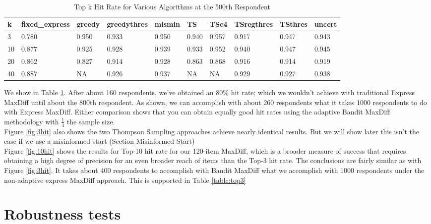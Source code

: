 \documentclass[nonblindrev]{informs3}
\begin{document}
\begin{table}
\begin{center}
\begin{tabular}{llllllllll}
\hline   k &  fixed\_express &  greedy &  greedythres &  mismin &    TS &  TSe4 &  TSregthres &  TSthres &  uncert \\ \hline   3 &          0.780 &   0.950 &        0.933 &   0.950 & 0.940 & 0.957 &       0.917 &    0.947 &   0.943 \\  10 &          0.877 &   0.925 &        0.928 &   0.939 & 0.933 & 0.952 &       0.940 &    0.947 &   0.945 \\  20 &          0.862 &   0.827 &        0.914 &   0.928 & 0.863 & 0.868 &       0.916 &    0.914 &   0.919 \\  40 &          0.887 &   NA &        0.926 &   0.937 & NA & NA &       0.929 &    0.927 &   0.938 \end{tabular}
\end{center}
\caption{Top k Hit Rate for Various Algorithms at the 500th Respondent}
\label{table:at500}
\end{table}
 We show in Table \ref{table:at500}. After about 160 respondents, we've obtained an 80\% hit rate; which we wouldn't achieve with traditional Express MaxDiff until about the 800th respondent.  As shown, we can accomplish with about 260 respondents what it takes 1000 respondents to do with Express MaxDiff.  Either comparison shows that you can obtain equally good hit rates using the adaptive Bandit MaxDiff methodology with $\frac{1}{4}$ the sample size.\\
Figure \ref{fig:3hit} also shows the two Thompson Sampling approaches achieve nearly identical results. But we will show later this isn't the case if we use a misinformed start (Section Misinformed Start)\\
Figure \ref{fig:10hit} shows the results for Top-10 hit rate for our 120-item MaxDiff, which is a broader measure of success that requires obtaining a high degree of precision for an even broader reach of items than the Top-3 hit rate.  The conclusions are fairly similar as with Figure \ref{fig:3hit}.  It takes about 400 respondents to accomplish with Bandit MaxDiff what we accomplish with 1000 respondents under the non-adaptive express MaxDiff approach. This is supported in Table \ref{table:top3}\\


\section{Robustness tests}
\end{document}
